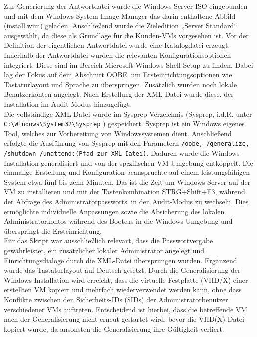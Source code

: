 \documentclass[a4paper,12pt]{article}
\begin{document}
Zur Generierung der Antwortdatei wurde die Windows-Server-ISO eingebunden und mit dem Windows System Image Manager das darin enthaltene Abbild (install.wim) geladen.
Anschlie\ss end wurde die Zieledition „Server Standard“ ausgewählt, da diese als Grundlage für die Kunden-VMs vorgesehen ist. Vor der Definition der eigentlichen Antwortdatei wurde eine Katalogdatei erzeugt.
Innerhalb der Antwortdatei wurden die relevanten Konfigurationsoptionen integriert. Diese sind im Bereich Microsoft-Windows-Shell-Setup zu finden.
Dabei lag der Fokus auf dem Abschnitt OOBE, um Ersteinrichtungsoptionen wie Tastaturlayout und Sprache zu überspringen. Zusätzlich wurden noch lokale Benutzerkonten angelegt. 
Nach Erstellung der XML-Datei wurde diese, der Installation im Audit-Modus hinzugefügt.\\

Die vollständige XML-Datei wurde im Sysprep Verzeichnis (Sysprep, i.d.R. unter \lstinline|C:\Windows\System32\Sysprep|
) gespeichert. Sysprep ist ein Windows eigenes Tool, welches zur Vorbereitung von Windowssystemen dient.
Anschlie\ss end erfolgte die Ausführung von Sysprep mit den Parametern \lstinline|/oobe, /generalize, /shutdown /unattend:(Pfad zur XML-Datei)|. 
Dadurch wurde die Windows-Installation generalisiert und von der spezifischen VM Umgebung entkoppelt. 
Die einmalige Erstellung und Konfiguration beanspruchte auf einem leistungsfähigen System etwa fünf bis zehn Minuten.
Das ist die Zeit um Windows-Server auf der VM zu installieren und mit der Tastenkombination STRG+Shift+F3, während der Abfrage des Administratorpassworts, in den Audit-Modus zu wechseln.
Dies ermöglichte individuelle Anpassungen sowie die Absicherung des lokalen Administratorkontos während des Bootens in die Windows Umgebung und überspringt die Ersteinrichtung.\\

Für das Skript war ausschlie\ss lich relevant, dass die Passwortvergabe gewährleistet, ein zusätzlicher lokaler Administrator angelegt und Einrichtungsdialoge durch die XML-Datei übersprungen wurden. Ergänzend wurde das Tastaturlayout auf Deutsch gesetzt.
Durch die Generalisierung der Windows-Installation wird erreicht, dass die virtuelle Festplatte (VHD/X) einer erstellten VM kopiert und mehrfach wiederverwendet werden kann, ohne dass Konflikte zwischen den Sicherheits-IDs (SIDs) der Administratorbenutzer verschiedener VMs auftreten. 
Entscheidend ist hierbei, dass die betreffende VM nach der Generalisierung nicht erneut gestartet wird, bevor die VHD(X)-Datei kopiert wurde, da ansonsten die Generalisierung ihre Gültigkeit verliert.\\
\end{document}

